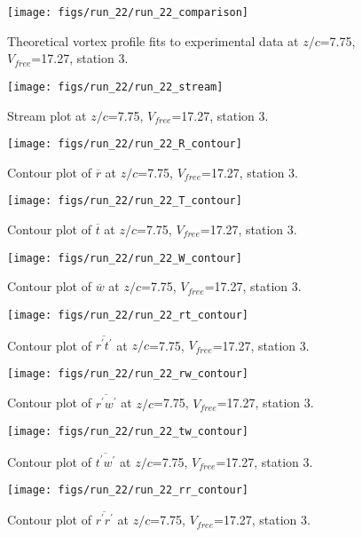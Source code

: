 \begin{figure}[H]
\centering
\texttt{[image: figs/run\_22/run\_22\_comparison]}
\caption{Theoretical vortex profile fits to experimental data at $z/c$=7.75, $V_{free}$=17.27, station 3.}
\end{figure}


\begin{figure}[H]
\centering
\texttt{[image: figs/run\_22/run\_22\_stream]}
\caption{Stream plot at $z/c$=7.75, $V_{free}$=17.27, station 3.}
\end{figure}


\begin{figure}[H]
\centering
\texttt{[image: figs/run\_22/run\_22\_R\_contour]}
\caption{Contour plot of $\overline{r}$ at $z/c$=7.75, $V_{free}$=17.27, station 3.}
\end{figure}


\begin{figure}[H]
\centering
\texttt{[image: figs/run\_22/run\_22\_T\_contour]}
\caption{Contour plot of $\overline{t}$ at $z/c$=7.75, $V_{free}$=17.27, station 3.}
\end{figure}


\begin{figure}[H]
\centering
\texttt{[image: figs/run\_22/run\_22\_W\_contour]}
\caption{Contour plot of $\overline{w}$ at $z/c$=7.75, $V_{free}$=17.27, station 3.}
\end{figure}


\begin{figure}[H]
\centering
\texttt{[image: figs/run\_22/run\_22\_rt\_contour]}
\caption{Contour plot of $\overline{r^\prime t^\prime}$ at $z/c$=7.75, $V_{free}$=17.27, station 3.}
\end{figure}


\begin{figure}[H]
\centering
\texttt{[image: figs/run\_22/run\_22\_rw\_contour]}
\caption{Contour plot of $\overline{r^\prime w^\prime}$ at $z/c$=7.75, $V_{free}$=17.27, station 3.}
\end{figure}


\begin{figure}[H]
\centering
\texttt{[image: figs/run\_22/run\_22\_tw\_contour]}
\caption{Contour plot of $\overline{t^\prime w^\prime}$ at $z/c$=7.75, $V_{free}$=17.27, station 3.}
\end{figure}


\begin{figure}[H]
\centering
\texttt{[image: figs/run\_22/run\_22\_rr\_contour]}
\caption{Contour plot of $\overline{r^\prime r^\prime}$ at $z/c$=7.75, $V_{free}$=17.27, station 3.}
\end{figure}


